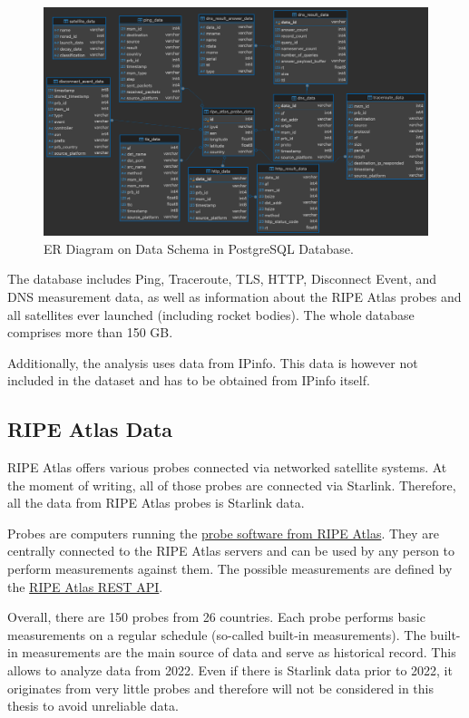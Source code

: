 \begin{figure}
	\includegraphics[width=\textwidth]{./chapters/methodology/img/er-diagram.png}
	\caption{ER Diagram on Data Schema in PostgreSQL Database.}
	\label{fig:er-diagram}
\end{figure}

The database includes Ping, Traceroute, TLS, HTTP, Disconnect Event, and DNS measurement data, as well as information about the RIPE Atlas probes and all satellites ever launched (including rocket bodies).
The whole database comprises more than 150 GB.

Additionally, the analysis uses data from IPinfo. This data is however not included in the dataset and has to be obtained from IPinfo itself.

\subsection*{RIPE Atlas Data}

RIPE Atlas offers various probes connected via networked satellite systems. At the moment of writing, all of those probes are connected via Starlink. Therefore, all the data from RIPE Atlas probes is Starlink data.

Probes are computers running the \href{https://github.com/RIPE-NCC/ripe-atlas-software-probe}{probe software from RIPE Atlas}. They are centrally connected to the RIPE Atlas servers and can be used by any person to perform measurements against them. The possible measurements are defined by the \href{https://atlas.ripe.net/docs/apis/rest-api-reference/}{RIPE Atlas REST API}.

Overall, there are 150 probes from 26 countries. Each probe performs basic measurements on a regular schedule (so-called built-in measurements). The built-in measurements are the main source of data and serve as historical record. This allows to analyze data from 2022. Even if there is Starlink data prior to 2022, it originates from very little probes and therefore will not be considered in this thesis to avoid unreliable data.
